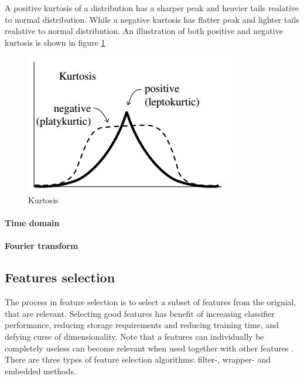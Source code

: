 \documentclass[USenglish]{ifimaster}  %
\begin{document}
A positive kurtosis of a distribution has a sharper peak and heavier tails realative to normal distribution. While a negative kurtosis has flatter peak and lighter tails realative to normal distribution. An illustration of both positive and negative kurtosis is shown in figure \ref{fig:kurtosis}


\begin{figure}[h]
    \centering
    \includegraphics[scale=0.8]{Figures/Kurtosis}
    \caption{Kurtosis}
    \label{fig:kurtosis}
\end{figure}


 \paragraph{Time domain}
\paragraph{Fourier transform}


\subsection{Features selection}\label{selection}
The process in feature selection is to select a subset of features from the orignial, that are relevant. Selecting good features has benefit of increasing classifier performance, reducing storage requirements and reducing training time, and defying curse of dimensionality. Note that a features can individually be completely useless can become relevant when used together with other features \cite{Guyon2006}. 
There are three types of feature selection algorithms: filter-, wrapper- and embedded methods.
\end{document}
